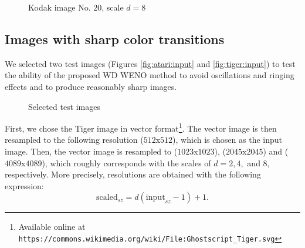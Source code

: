 	\begin{figure}
		\begin{center}
			 \quad 
			 \quad 
			 \quad
			 \quad
			 \quad
			 \quad
			\caption{Kodak image No. 20, scale $d=8$}
			\label{fig:kodim20:scale8}
		\end{center}
	\end{figure}
	
		
	
	
	\subsection{Images with sharp color transitions}
	
	We selected two test images (Figures \ref{fig:atari:input} and \ref{fig:tiger:input}) to test the ability of the proposed {WD} WENO method to avoid oscillations and ringing effects and to produce reasonably sharp images.

	\begin{figure}
		\centering
		\caption{Selected test images}
		\label{fig:referenceimages}
	\end{figure}
	
	First, we chose the Tiger image in vector format\footnote{Available online at \texttt{https://commons.wikimedia.org/wiki/File:Ghostscript\_Tiger.svg}}. The vector image is then resampled to the following 
	resolution ($512$x$512$), which is chosen as the input image. Then, the vector image is resampled to 
	($1023$x$1023$), ($2045$x$2045$) and ($4089$x$4089$), which roughly corresponds with the scales of  
	$d=2, 4,$ and $8$, respectively. More precisely, resolutions are obtained with the following expression: 
	$$\mathrm{scaled}_{sz} = d(\mathrm{input}_{sz} - 1)+1.$$
			
